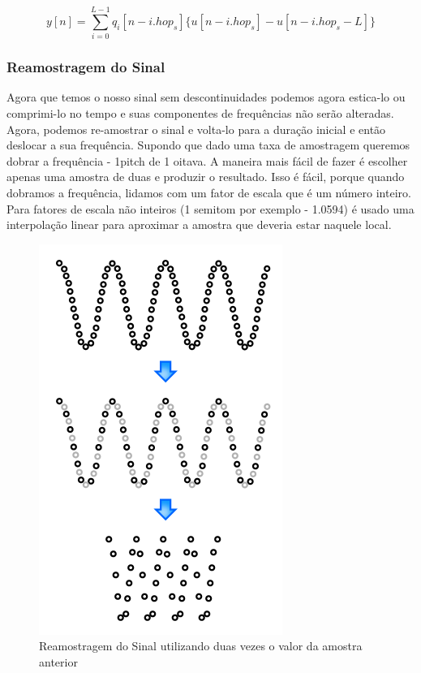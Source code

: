 					\begin{equation}
						\label{eq-overlap-sintese}
						y[n] = \sum_{i=0}^{L-1} q_i[n-i.hop_s]\{ u[n-i.hop_s]-u[n-i.hop_s-L]\} 
					\end{equation}
			
			\subsubsection{Reamostragem do Sinal}
				
				Agora que temos o nosso sinal sem descontinuidades podemos agora estica-lo ou comprimi-lo no tempo e suas componentes de frequências não serão alteradas. Agora, podemos re-amostrar o sinal 	e volta-lo para a duração inicial e então deslocar a sua frequência. Supondo que dado uma taxa de amostragem queremos dobrar a frequência - 1pitch de 1 oitava. A maneira mais fácil de fazer é escolher apenas uma amostra de duas e produzir o resultado. Isso é fácil, porque quando dobramos a frequência, lidamos com um fator de escala que é um número inteiro. Para fatores de escala não inteiros (1 semitom por exemplo - 1.0594) é usado uma interpolação linear para aproximar a amostra que deveria estar naquele local.
				
				\begin{figure}[!ht]
					\centering
					\includegraphics[scale=0.7]{./figuras/phase-vocoder-05.PNG}
					\caption{Reamostragem do Sinal utilizando duas vezes o valor da amostra anterior}
				\end{figure}
			
